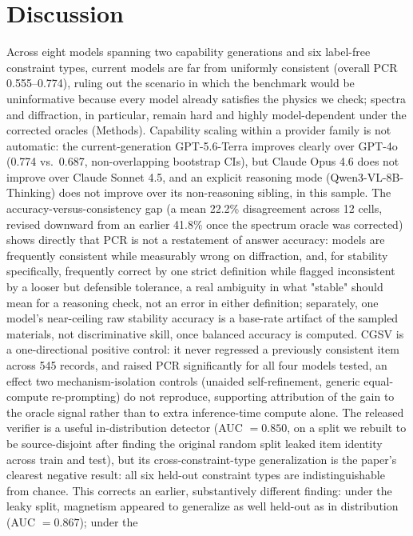 \documentclass[pdflatex,sn-nature]{sn-jnl}
\begin{document}
\section*{Discussion}
Across eight models spanning two capability generations and six label-free constraint
types, current models are far from
uniformly consistent (overall PCR 0.555--0.774), ruling out the scenario in which the
benchmark would be uninformative because every model already satisfies the physics we
check; spectra and diffraction, in particular, remain hard and highly model-dependent
under the corrected oracles (Methods). Capability scaling within a provider family is not
automatic: the current-generation GPT-5.6-Terra improves clearly over GPT-4o (0.774 vs.\
0.687, non-overlapping bootstrap CIs), but Claude Opus 4.6 does not improve over Claude
Sonnet 4.5, and an explicit reasoning mode (Qwen3-VL-8B-Thinking) does not improve over its
non-reasoning sibling, in this sample. The accuracy-versus-consistency gap (a mean 22.2\% disagreement across 12 cells, revised
downward from an earlier 41.8\% once the spectrum oracle was corrected) shows
directly that PCR is not a restatement of answer accuracy: models are frequently
consistent while measurably wrong on diffraction, and, for stability specifically, frequently correct
by one strict definition while flagged inconsistent by a looser but defensible
tolerance, a real ambiguity in what "stable" should mean for a reasoning check,
not an error in either definition; separately, one model's near-ceiling raw stability
accuracy is a base-rate artifact of the sampled materials, not discriminative skill, once
balanced accuracy is computed. CGSV is a one-directional positive
control: it never regressed a previously consistent item across 545 records, and
raised PCR significantly for all four models tested, an effect two mechanism-isolation
controls (unaided self-refinement, generic equal-compute re-prompting) do not reproduce,
supporting attribution of the gain to the oracle signal rather than to extra
inference-time compute alone. The released verifier is a useful in-distribution
detector (AUC $=0.850$, on a split we rebuilt to be source-disjoint after finding the
original random split leaked item identity across train and test), but its
cross-constraint-type generalization is the paper's clearest
negative result: all six held-out constraint types are indistinguishable from chance.
This corrects an earlier, substantively different finding: under the leaky split, magnetism
appeared to generalize as well held-out as in distribution (AUC $=0.867$); under the
\end{document}

